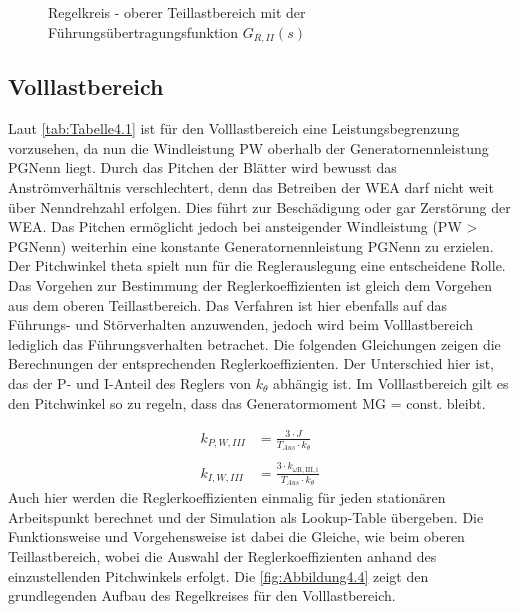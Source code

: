  \begin{figure}[H]
    \centering
    \caption[Reglerkreis - oberer Teillastbereich]{Regelkreis - oberer Teillastbereich mit der Führungsübertragungsfunktion $G_{R,II}(s)$ \cite{SkriptSchulte}}
    \label{fig:Abbildung4.3}
\end{figure}

\subsection{Volllastbereich}
Laut \autoref{tab:Tabelle4.1} ist für den Volllastbereich eine Leistungsbegrenzung vorzusehen, da nun die Windleistung \acs{PW} oberhalb der Generatornennleistung \acs{PGNenn} liegt. Durch das Pitchen der Blätter wird bewusst das Anströmverhältnis verschlechtert, denn das Betreiben der WEA darf nicht weit über Nenndrehzahl erfolgen. Dies führt zur Beschädigung oder gar Zerstörung der WEA. Das Pitchen ermöglicht jedoch bei ansteigender Windleistung (\acs{PW} > \acs{PGNenn}) weiterhin eine konstante Generatornennleistung \acs{PGNenn} zu erzielen. Der Pitchwinkel \acs{theta} spielt nun für die Reglerauslegung eine entscheidene Rolle.\\
Das Vorgehen zur Bestimmung der Reglerkoeffizienten ist gleich dem Vorgehen aus dem oberen Teillastbereich. Das Verfahren ist hier ebenfalls auf das Führungs- und Störverhalten anzuwenden, jedoch wird beim Volllastbereich lediglich das Führungsverhalten betrachet. Die folgenden Gleichungen zeigen die Berechnungen der entsprechenden Reglerkoeffizienten. Der Unterschied hier ist, das der P- und I-Anteil des Reglers von $k_\theta$ abhängig ist. Im Volllastbereich gilt es den Pitchwinkel so zu regeln, dass das Generatormoment \acs{MG} = const. bleibt.

\begin{align}
    k_{P,W,III} &= \frac{3 \cdot J}{T_{Aus} \cdot k_\theta}   \label{eq:Gleichung4.13}\\
    \nonumber\\
    k_{I,W,III} &= \frac{3 \cdot k_{\omega\mathrm{R,III,i}}}{T_{Aus} \cdot k_\theta}\label{eq:Gleichung4.14}
\end{align}
\newline
Auch hier werden die Reglerkoeffizienten einmalig für jeden stationären Arbeitspunkt berechnet und der Simulation als Lookup-Table übergeben. Die Funktionsweise und Vorgehensweise ist dabei die Gleiche, wie beim oberen Teillastbereich, wobei die Auswahl der Reglerkoeffizienten anhand des einzustellenden Pitchwinkels erfolgt. Die \autoref{fig:Abbildung4.4} zeigt den grundlegenden Aufbau des Regelkreises für den Volllastbereich.

